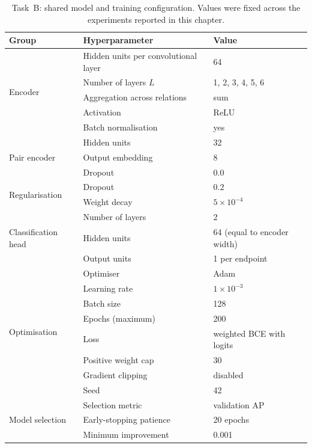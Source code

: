 \begin{table}[H]
  \centering
  \caption{Task~B: shared model and training configuration.
    Values were fixed across the experiments reported in this chapter.}
  \label{tab:hparams-common}
  \begin{tabular}{lll}
    \toprule
    Group & Hyperparameter & Value \\
    \midrule
    \multirow{5}{*}{Encoder}
      & Hidden units per convolutional layer & 64 \\
      & Number of layers $L$                 & 1, 2, 3, 4, 5, 6 \\
      & Aggregation across relations         & sum \\
      & Activation                           & ReLU \\
      & Batch normalisation                  & yes \\
    \midrule
    \multirow{3}{*}{Pair encoder}
      & Hidden units                         & 32 \\
      & Output embedding                     & 8 \\
      & Dropout                              & 0.0 \\
    \midrule
    \multirow{2}{*}{Regularisation}
      & Dropout                              & 0.2 \\
      & Weight decay                         & $5\times10^{-4}$ \\
    \midrule
    \multirow{3}{*}{Classification head}
      & Number of layers                     & 2 \\
      & Hidden units                         & 64 (equal to encoder width) \\
      & Output units                         & 1 per endpoint \\
    \midrule
    \multirow{8}{*}{Optimisation}
      & Optimiser                            & Adam \\
      & Learning rate                        & $1\times10^{-3}$ \\
      & Batch size                           & 128 \\
      & Epochs (maximum)                     & 200 \\
      & Loss                                 & weighted BCE with logits \\
      & Positive weight cap                  & 30 \\
      & Gradient clipping                    & disabled \\
      & Seed                                 & 42 \\
    \midrule
    \multirow{3}{*}{Model selection}
      & Selection metric                     & validation AP \\
      & Early-stopping patience              & 20 epochs \\
      & Minimum improvement                  & 0.001 \\
    \bottomrule
  \end{tabular}
\end{table}

